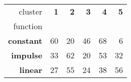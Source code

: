 \begin{tabular}{r|rrrrr}
cluster & \textbf{1} & \textbf{2} & \textbf{3} & \textbf{4} & \textbf{5} \\
function &  &  &  &  &  \\
\hline
\textbf{constant} & {\cellcolor[HTML]{045B8E}} \color[HTML]{F1F1F1} 60 & {\cellcolor[HTML]{D6D6E9}} \color[HTML]{000000} 20 & {\cellcolor[HTML]{2D8ABD}} \color[HTML]{F1F1F1} 46 & {\cellcolor[HTML]{023858}} \color[HTML]{F1F1F1} 68 & {\cellcolor[HTML]{FFF7FB}} \color[HTML]{000000} 6 \\
\textbf{impulse} & {\cellcolor[HTML]{BCC7E1}} \color[HTML]{000000} 33 & {\cellcolor[HTML]{023858}} \color[HTML]{F1F1F1} 62 & {\cellcolor[HTML]{FFF7FB}} \color[HTML]{000000} 20 & {\cellcolor[HTML]{0569A5}} \color[HTML]{F1F1F1} 53 & {\cellcolor[HTML]{C4CBE3}} \color[HTML]{000000} 32 \\
\textbf{linear} & {\cellcolor[HTML]{F1EBF4}} \color[HTML]{000000} 27 & {\cellcolor[HTML]{023F64}} \color[HTML]{F1F1F1} 55 & {\cellcolor[HTML]{FFF7FB}} \color[HTML]{000000} 24 & {\cellcolor[HTML]{8CB3D5}} \color[HTML]{000000} 38 & {\cellcolor[HTML]{023858}} \color[HTML]{F1F1F1} 56 \\
\end{tabular}

